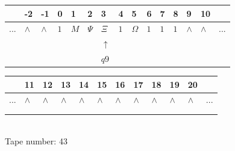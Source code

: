 \documentclass[11pt]{article}
\begin{document}
\begin{table}[H]
\centering
\begin{tabular}{lllllllllllllll}
 & -2 & -1 & 0 & 1 & 2 & 3 & 4 & 5 & 6 & 7 & 8 & 9 & 10 & \\
\hline
$...$ & \multicolumn{1}{|l|}{$\wedge$} & \multicolumn{1}{|l|}{$\wedge$} & \multicolumn{1}{|l|}{$1$} & \multicolumn{1}{|l|}{$M$} & \multicolumn{1}{|l|}{$\Psi$} & \multicolumn{1}{|l|}{$\Xi$} & \multicolumn{1}{|l|}{$1$} & \multicolumn{1}{|l|}{$\Omega$} & \multicolumn{1}{|l|}{$1$} & \multicolumn{1}{|l|}{$1$} & \multicolumn{1}{|l|}{$1$} & \multicolumn{1}{|l|}{$\wedge$} & \multicolumn{1}{|l|}{$\wedge$} & $...$\\
\hline
&  &  &  &  &  & $\uparrow$ &  &  &  &  &  &  &  &  \\
&  &  &  &  &  & $ q9 $ &  &  &  &  &  &  &  &  \\
\end{tabular}
\begin{tabular}{llllllllllll}
 & 11 & 12 & 13 & 14 & 15 & 16 & 17 & 18 & 19 & 20 & \\
\hline
$...$ & \multicolumn{1}{|l|}{$\wedge$} & \multicolumn{1}{|l|}{$\wedge$} & \multicolumn{1}{|l|}{$\wedge$} & \multicolumn{1}{|l|}{$\wedge$} & \multicolumn{1}{|l|}{$\wedge$} & \multicolumn{1}{|l|}{$\wedge$} & \multicolumn{1}{|l|}{$\wedge$} & \multicolumn{1}{|l|}{$\wedge$} & \multicolumn{1}{|l|}{$\wedge$} & \multicolumn{1}{|l|}{$\wedge$} & $...$\\
\hline
&  &  &  &  &  &  &  &  &  &  &  \\
&  &  &  &  &  &  &  &  &  &  &  \\
\end{tabular}
\\
Tape number: 43
\noindent\makebox[\linewidth]{\hdashrule{\textwidth}{1pt}{1pt}}\end{table}
\clearpage
\end{document}
